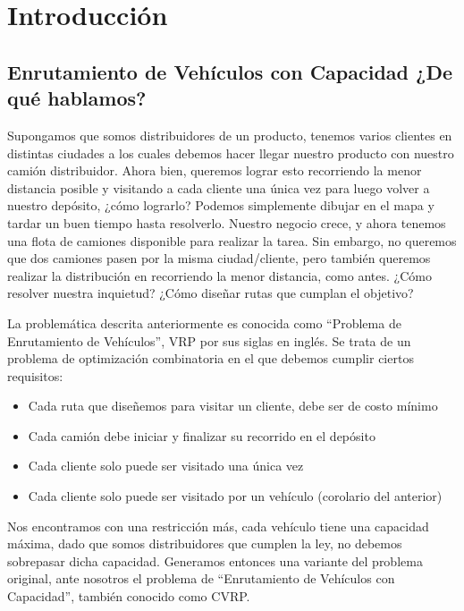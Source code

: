\section{Introducción}
\subsection{Enrutamiento de Vehículos con Capacidad ¿De qué hablamos?}
Supongamos que somos distribuidores de un producto, tenemos varios clientes en distintas ciudades a los cuales debemos hacer llegar nuestro producto con nuestro camión distribuidor. Ahora bien, queremos lograr esto recorriendo la menor distancia posible y visitando a cada cliente una única vez para luego volver a nuestro depósito, ¿cómo lograrlo? Podemos simplemente dibujar en el mapa y tardar un buen tiempo hasta resolverlo. Nuestro negocio crece, y ahora tenemos una flota de camiones disponible para realizar la tarea. Sin embargo, no queremos que dos camiones pasen por la misma ciudad/cliente, pero también queremos realizar la distribución en recorriendo la menor distancia, como antes. ¿Cómo resolver nuestra inquietud? ¿Cómo diseñar rutas que cumplan el objetivo?

\vskip 8pt

La problemática descrita anteriormente es conocida como ``Problema de Enrutamiento de Vehículos'', VRP por sus siglas en inglés. Se trata de un problema de optimización combinatoria en el que debemos cumplir ciertos requisitos:

\begin{itemize}
	\item Cada ruta que diseñemos para visitar un cliente, debe ser de costo mínimo
	\item Cada camión debe iniciar y finalizar su recorrido en el depósito
	\item Cada cliente solo puede ser visitado una única vez
	\item Cada cliente solo puede ser visitado por un vehículo (corolario del anterior)
\end{itemize}

\vskip 8pt

Nos encontramos con una restricción más, cada vehículo tiene una capacidad máxima, dado que somos distribuidores que cumplen la ley, no debemos sobrepasar dicha capacidad. Generamos entonces una variante del problema original, ante nosotros el problema de ``Enrutamiento de Vehículos con Capacidad'', también conocido como CVRP.

\vskip 8pt


